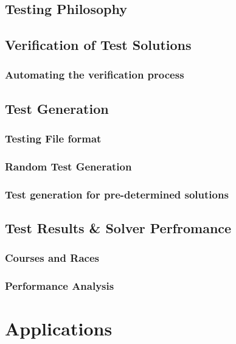 \documentclass[condensed]{union-cs-thesis}
\begin{document}
    \section{Testing Philosophy}
    
    \section{Verification of Test Solutions}
        
        \subsection{Automating the verification process}
        
    \section{Test Generation}
        \subsection{Testing File format}
        
        \subsection{Random Test Generation}
        
        \subsection{Test generation for pre-determined solutions}
        
    \section{Test Results \& Solver Perfromance}
        \subsection{Courses and Races}
        
        \subsection{Performance Analysis}
        
\chapter{Applications}
\label{sec:applications}

\end{document}
